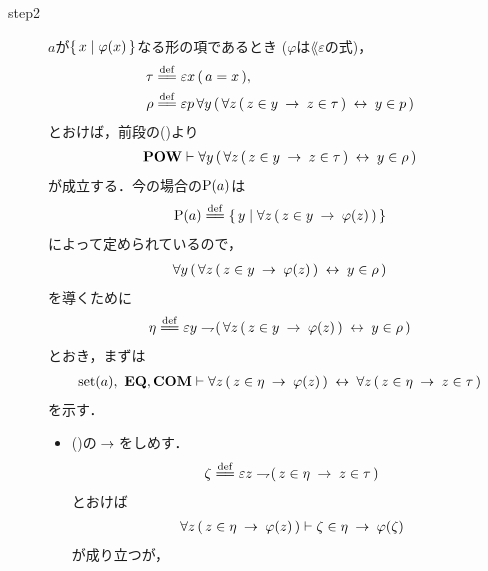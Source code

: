 \begin{sketch}
\begin{description}
			\item[step2]
				$a$が$\left\{\, x \mid \varphi(x)\, \right\}$なる形の項であるとき
				($\varphi$は$\lang{\varepsilon}$の式)，
				\begin{align}
					\tau &\defeq \varepsilon x\, (\, a = x\, ), \\
					\rho &\defeq \varepsilon p\, \forall y\, (\, \forall z\, (\, z \in y \rarrow z \in \tau\, ) \lrarrow y \in p\, )
				\end{align}
				とおけば，前段の()より
				\begin{align}
					\mbox{{\bf POW}} \vdash \forall y\, (\, \forall z\, (\, z \in y \hspace{0.25em}\rightarrow\hspace{0.25em} z \in \tau\, ) \hspace{0.25em}\leftrightarrow\hspace{0.25em} y \in \rho\, )
					\label{fom:power_of_a_set_is_a_set_4}
				\end{align}
				が成立する．今の場合の$\operatorname*{P} (a)$は
				\begin{align}
					\power{a} \defeq \Set{y}{\forall z\, (\, z \in y \rarrow \varphi(z)\, )}
				\end{align}
				によって定められているので，
				\begin{align}
					\forall y\, (\, \forall z\, (\, z \in y \hspace{0.25em}\rightarrow\hspace{0.25em} \varphi(z)\, ) \hspace{0.25em}\leftrightarrow\hspace{0.25em} y \in \rho\, )
					\label{fom:power_of_a_set_is_a_set_2}
				\end{align}
				を導くために
				\begin{align}
					\eta \defeq \varepsilon y \negation (\, \forall z\, (\, z \in y \rarrow \varphi(z)\, ) \lrarrow y \in \rho\, )
				\end{align}
				とおき，まずは
				\begin{align}
					\operatorname*{set} (a),\ \mbox{{\bf EQ}},\mbox{\bf COM} \vdash 
					\forall z\, (\, z \in \eta \hspace{0.25em}\rightarrow\hspace{0.25em} \varphi(z)\, )
					\hspace{0.25em}\leftrightarrow\hspace{0.25em} \forall z\, (\, z \in \eta \hspace{0.25em}\rightarrow\hspace{0.25em} z \in \tau\, )
					\label{fom:power_of_a_set_is_a_set_3}
				\end{align}
				を示す．
				\begin{itemize}
					\item ()の$\hspace{0.25em}\rightarrow\hspace{0.25em}$をしめす．
						\begin{align}
							\zeta \defeq \varepsilon z \negation
							(\, z \in \eta \rarrow z \in \tau\, )
						\end{align}
						とおけば
						\begin{align}
							\forall z\, (\, z \in \eta \hspace{0.25em}\rightarrow\hspace{0.25em} \varphi(z)\, )
							\vdash \zeta \in \eta \hspace{0.25em}\rightarrow\hspace{0.25em} \varphi(\zeta)
						\end{align}
						が成り立つが，
						\begin{align}

\end{align}
\end{itemize}
\end{description}
\end{sketch}
